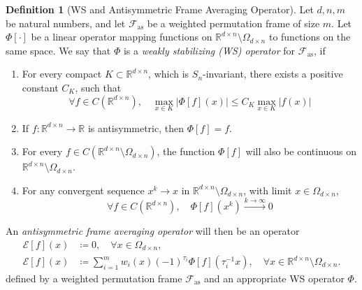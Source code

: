 \documentclass{amsart}
\theoremstyle{plain}
\theoremstyle{definition}
\newtheorem{defn}[theorem]{Definition}
\theoremstyle{remark}
\newcommand{\RR}{\mathbb{R}}
\newcommand{\abs}[1]{\left\lvert#1\right\rvert}
\begin{document}
\begin{defn}[WS and Antisymmetric Frame Averaging Operator] \label{def:afa}
Let $d,n,m$ be natural numbers, and let $\mathcal{F}_{\text{as}}$ be a weighted permutation frame of size $m$. Let  $\Phi[\cdot]$ be a linear operator mapping functions on $\RR^{d\times n}\setminus \Omega_{d\times n}$ to functions on the same space. We say that $\Phi $ is a \textit{weakly stabilizing (WS) operator} for $\mathcal{F}_{\text{as}}$, if
\begin{enumerate}

\item For every compact $K \subset \RR^{d \times n}$, which is $S_n$-invariant, there exists a positive constant $C_K$, such that
  \begin{equation} \label{eq:cond_bound_antis}
    \forall f\in  C\left(\RR^{d \times n}\right), \quad   \max_{x \in K}{\abs{\Phi[f](x)}} \leq C_K \max_{x \in K}{\abs{f(x)}}
  \end{equation}
  \item If $f:\RR^{d\times n} \to \RR$ is antisymmetric, then $\Phi[f] = f$.
    \item \label{cond:proj} For every $f\in  C\left(\RR^{d \times n} \setminus \Omega_{d\times n} \right)$, the function $\Phi[f]$ will also be continuous on $\RR^{d\times n}\setminus \Omega_{d\times n} $.
    \item For any convergent sequence 
  $x^k \to x$ in $\RR^{d \times n} \setminus{\Omega_{d \times n}}$, with limit $x \in \Omega_{d \times n}$,
  \begin{equation} \label{eq:cond_weak_convergence}
\forall f\in  C\left(\RR^{d \times n}\right), \quad     \Phi[f]\left(x^k \right)  \stackrel{k \to \infty}{\rightarrow} 0
  \end{equation}

\end{enumerate}
An \emph{antisymmetric frame averaging operator} will then be an operator
\begin{equation} \label{eq:form2frame}
    \begin{split}
        \mathcal{E}[f](x) &\coloneq 0, \quad \forall x \in \Omega_{d \times n}, \\
        \mathcal{E}[f](x) &\coloneq \sum_{i=1}^{m}{w_i(x)(-1)^{\tau_i}\Phi[f]\left( \tau_i^{-1} x \right)}, \quad \forall x \in \RR^{d \times n} \setminus{\Omega_{d \times n}}.
    \end{split}
    \end{equation}
    defined by a weighted permutation frame $\mathcal{F}_{\text{as}}$ and an appropriate WS operator $\Phi$. 
\end{defn}
\end{document}
